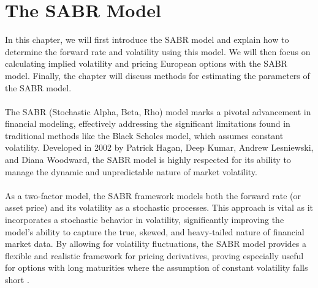 \section{ The SABR Model} \label{SABR_model}
In this chapter, we will first introduce the SABR model
 and explain how to determine the forward rate and 
 volatility using this model. We will then focus on 
 calculating implied volatility and pricing European 
 options with the SABR model. Finally, the chapter 
 will discuss methods for estimating the parameters 
 of the SABR model.
\\\\
The SABR (Stochastic Alpha, Beta, Rho) model marks a pivotal advancement 
in financial modeling, effectively addressing the significant limitations 
found in traditional methods like the Black Scholes model, which assumes 
constant volatility. Developed in 2002 by Patrick Hagan, Deep Kumar, 
Andrew Lesniewski, and Diana Woodward, the SABR model is highly respected for 
its ability to manage the dynamic and unpredictable nature of market 
volatility.
\\\\
As a two-factor model, the SABR framework models both the forward rate 
(or asset price) and its volatility as a stochastic processes. This approach 
is vital as it incorporates a stochastic behavior in volatility, significantly 
improving the model's ability to capture the true, skewed, and heavy-tailed 
nature of financial market data. By allowing for volatility fluctuations, 
the SABR model provides a flexible and realistic framework for pricing 
derivatives, proving especially useful for options with long maturities where 
the assumption of constant volatility falls short \cite{Smile}.
